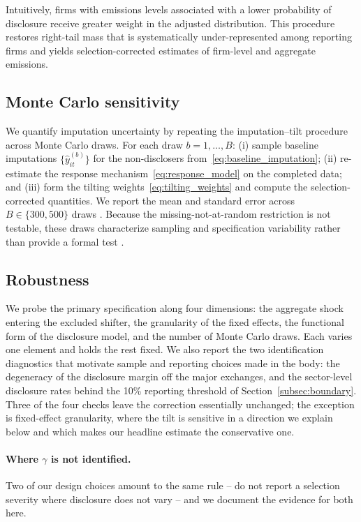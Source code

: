 \documentclass[a4paper,12pt]{article}
\newcommand{\citep}[1]{\parencite{#1}}
\begin{document}
Intuitively, firms with emissions levels associated with a lower probability of disclosure receive greater weight in the adjusted distribution. This procedure restores right-tail mass that is systematically under-represented among reporting firms and yields selection-corrected estimates of firm-level and aggregate emissions.

\subsection{Monte Carlo sensitivity}

We quantify imputation uncertainty by repeating the imputation--tilt procedure across Monte Carlo draws. For each draw $b = 1, \dots, B$: (i) sample baseline imputations $\{\hat{y}_{it}^{(b)}\}$ for the non-disclosers from~\eqref{eq:baseline_imputation}; (ii) re-estimate the response mechanism~\eqref{eq:response_model} on the completed data; and (iii) form the tilting weights~\eqref{eq:tilting_weights} and compute the selection-corrected quantities. We report the mean and standard error across $B \in \{300, 500\}$ draws \citep{gohil2020multiple}. Because the missing-not-at-random restriction is not testable, these draws characterize sampling and specification variability rather than provide a formal test \citep{little2019statistical}.

\subsection{Robustness}
\label{app:robustness}
We probe the primary specification along four dimensions: the aggregate shock entering the excluded shifter, the granularity of the fixed effects, the functional form of the disclosure model, and the number of Monte Carlo draws. Each varies one element and holds the rest fixed. We also report the two identification diagnostics that motivate sample and reporting choices made in the body: the degeneracy of the disclosure margin off the major exchanges, and the sector-level disclosure rates behind the 10\% reporting threshold of Section~\ref{subsec:boundary}. Three of the four checks leave the correction essentially unchanged; the exception is fixed-effect granularity, where the tilt is sensitive in a direction we explain below and which makes our headline estimate the conservative one.

\paragraph{Where $\gamma$ is not identified.} Two of our design choices amount to the same rule -- do not report a selection severity where disclosure does not vary -- and we document the evidence for both here.
\end{document}
